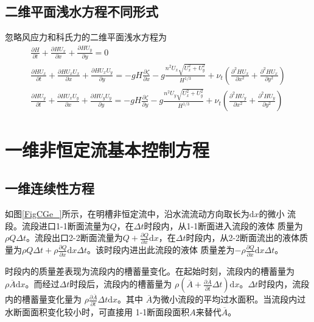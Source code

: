 \subsection{二维平面浅水方程不同形式}
忽略风应力和科氏力的二维平面浅水方程为
\begin{equation}
  \begin{gathered}
  \frac{\partial H}{\partial t} +
  \frac{\partial HU_{x}}{\partial x} +
  \frac{\partial HU_{y}}{\partial y}
  =
  0
    \\
  \frac{\partial HU_{x}}{\partial t} +
  \frac{\partial HU_{x}U_{x}}{\partial x} +
  \frac{\partial HU_{x}U_{y}}{\partial y} 
  =
  -gH\frac{\partial \zeta}{\partial x}
  -g\frac{n^{2}U_{x}\sqrt{U_{x}^{2}+U_{y}^{2}}}{H^{1/3}}
  +
  \nu_{t}\left(
    \frac{\partial^{2}HU_{x}}{\partial x^{2}}+
    \frac{\partial^{2}HU_{x}}{\partial y^{2}}
\right)
    \\
  \frac{\partial HU_{y}}{\partial t} +
  \frac{\partial HU_{x}U_{y}}{\partial x} +
  \frac{\partial HU_{y}U_{y}}{\partial y} 
  =
  -gH\frac{\partial \zeta}{\partial y}
  -g\frac{n^{2}U_{y}\sqrt{U_{x}^{2}+U_{y}^{2}}}{H^{1/3}}
  +
  \nu_{t}\left(
    \frac{\partial^{2}HU_{y}}{\partial x^{2}}+
    \frac{\partial^{2}HU_{y}}{\partial y^{2}}
\right)
  \end{gathered}
\end{equation}

\section{一维非恒定流基本控制方程}
\subsection{一维连续性方程}
如图\ref{FigCGe_}所示，在明槽非恒定流中，沿水流流动方向取长为$\mathrm{d}x$的微小
流段。流段进口1-1断面流量为$Q$，在$\Delta t$时段内，从1-1断面进入流段的液体
质量为$\rho Q\Delta t$。流段出口2-2断面流量为$Q+\frac{\partial Q}{\partial
x}\mathrm{d}x$，在$\Delta t$时段内，从2-2断面流出的液体质量为$\rho Q\Delta
t+\rho\frac{\partial Q}{\partial x}\mathrm{d}x\Delta t$。该时段内进出此流段的液体
质量差为$-\rho\frac{\partial Q}{\partial x}\mathrm{d}x\Delta t$。

时段内的质量差表现为流段内的槽蓄量变化。在起始时刻，流段内的槽蓄量为
$\rho\overline{A}\mathrm{d}x$。而经过$\Delta t$时段后，流段内的槽蓄量为
$\rho\left(\overline{A}+\frac{\partial\overline{A}}{\partial t}\Delta
t\right)\mathrm{d}x$。$\Delta t$时段内，流段内的槽蓄量变化量为
$\rho\frac{\partial \overline{A}}{\partial t}\Delta t\mathrm{d}x$。其中
$\overline{A}$为微小流段的平均过水面积。当流段内过水断面面积变化较小时，可直接用
1-1断面段面积$A$来替代$\overline{A}$。

